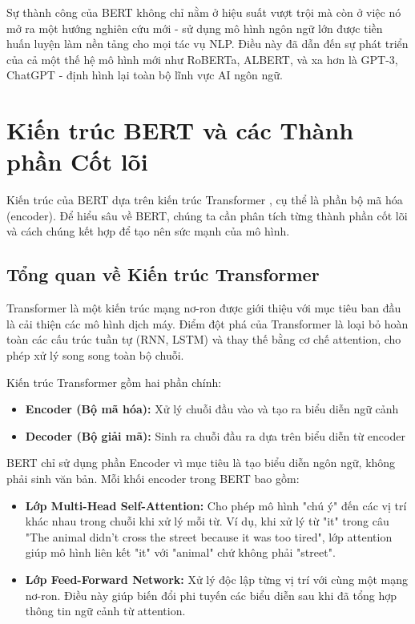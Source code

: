 Sự thành công của BERT không chỉ nằm ở hiệu suất vượt trội mà còn ở việc nó mở ra một hướng nghiên cứu mới - sử dụng mô hình ngôn ngữ lớn được tiền huấn luyện làm nền tảng cho mọi tác vụ NLP. Điều này đã dẫn đến sự phát triển của cả một thế hệ mô hình mới như RoBERTa, ALBERT, và xa hơn là GPT-3, ChatGPT - định hình lại toàn bộ lĩnh vực AI ngôn ngữ.

\section{Kiến trúc BERT và các Thành phần Cốt lõi}
\label{sec:kien_truc_bert}
Kiến trúc của BERT dựa trên kiến trúc Transformer \cite{vaswani2017attention}, cụ thể là phần bộ mã hóa (encoder). Để hiểu sâu về BERT, chúng ta cần phân tích từng thành phần cốt lõi và cách chúng kết hợp để tạo nên sức mạnh của mô hình.

\subsection{Tổng quan về Kiến trúc Transformer}
\label{ssec:tong_quan_transformer}
Transformer là một kiến trúc mạng nơ-ron được giới thiệu với mục tiêu ban đầu là cải thiện các mô hình dịch máy. Điểm đột phá của Transformer là loại bỏ hoàn toàn các cấu trúc tuần tự (RNN, LSTM) và thay thế bằng cơ chế attention, cho phép xử lý song song toàn bộ chuỗi.

Kiến trúc Transformer gồm hai phần chính:
\begin{itemize}
    \item \textbf{Encoder (Bộ mã hóa):} Xử lý chuỗi đầu vào và tạo ra biểu diễn ngữ cảnh
    \item \textbf{Decoder (Bộ giải mã):} Sinh ra chuỗi đầu ra dựa trên biểu diễn từ encoder
\end{itemize}

BERT chỉ sử dụng phần Encoder vì mục tiêu là tạo biểu diễn ngôn ngữ, không phải sinh văn bản. Mỗi khối encoder trong BERT bao gồm:

\begin{itemize}
    \item \textbf{Lớp Multi-Head Self-Attention:} Cho phép mô hình "chú ý" đến các vị trí khác nhau trong chuỗi khi xử lý mỗi từ. Ví dụ, khi xử lý từ "it" trong câu "The animal didn't cross the street because it was too tired", lớp attention giúp mô hình liên kết "it" với "animal" chứ không phải "street".
    
    \item \textbf{Lớp Feed-Forward Network:} Xử lý độc lập từng vị trí với cùng một mạng nơ-ron. Điều này giúp biến đổi phi tuyến các biểu diễn sau khi đã tổng hợp thông tin ngữ cảnh từ attention.
\end{itemize}

